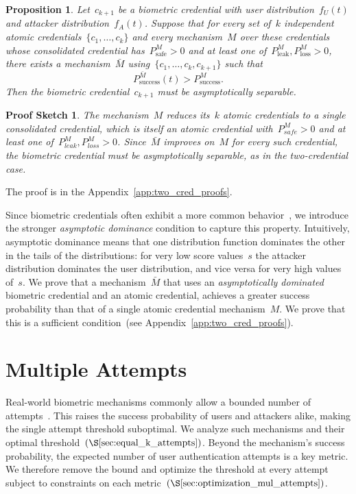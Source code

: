 \documentclass[conference,compsoc]{IEEEtran}
\newtheorem{proposition}{Proposition}
\newtheorem*{proofsketch}{Proof Sketch}
\begin{document}
\begin{proposition}\label{thm:nec_cond_for_improve_k_atm}
    Let~$c_{k+1}$ be a biometric credential with user distribution~$f_U(t)$ and attacker distribution~$f_A(t)$. Suppose that for every set of~$k$ independent atomic credentials~$\{c_1,\ldots,c_k\}$ and every mechanism~$M$ over these credentials whose consolidated credential has~$P^M_\text{safe} > 0$ and at least one of~$P^M_\text{leak},P^M_\text{loss} > 0$, there exists a mechanism~$\bar{M}$ using~$\{c_1,\ldots,c_k,c_{k+1}\}$ such that
    \begin{equation*}
    P^{\bar{M}}_{\text{success}}(t) > P^{M}_{\text{success}}.
    \end{equation*}
    Then the biometric credential~$c_{k+1}$ must be asymptotically separable.
\end{proposition} 
\begin{proofsketch}
The mechanism~$M$ reduces its~$k$ atomic credentials to a single consolidated credential, which is itself an atomic credential with~$P^M_{safe} > 0$ and at least one of~$P^M_{leak}, P^M_{loss} > 0$.
Since~$\bar{M}$ improves on~$M$ for every such credential, the biometric credential must be asymptotically separable, as in the two-credential case.
\end{proofsketch}
\noindent
The proof is in the Appendix~\ref{app:two_cred_proofs}.

Since biometric credentials often exhibit a more common behavior~\cite{Slob2005,anil2004}, we introduce the stronger \emph{asymptotic dominance} condition to capture this property. Intuitively, asymptotic dominance means that one distribution function dominates the other in the tails of the distributions: for very low score values~$s$ the attacker distribution dominates the user distribution, and vice versa for very high values of~$s$. We prove that a mechanism~$\bar{M}$ that uses an \emph{asymptotically dominated} biometric credential and an atomic credential, achieves a greater success probability than that of a single atomic credential mechanism~$M$. We prove that this is a sufficient condition~(see Appendix~\ref{app:two_cred_proofs}). 

\section{Multiple Attempts}
\label{sec:multiple_auth_attempts}
\noindent
Real-world biometric mechanisms commonly allow a bounded number of attempts~\cite{Chen2023BrutePrint, typical_aut_attempts}. This raises the success probability of users and attackers alike, making the single attempt threshold suboptimal. We analyze such mechanisms and their optimal threshold~$(\S\ref{sec:equal_k_attempts})$. Beyond the mechanism's success probability, the expected number of user authentication attempts is a key metric. We therefore remove the bound and optimize the threshold at every attempt subject to constraints on each metric~$(\S\ref{sec:optimization_mul_attempts})$.
\end{document}
